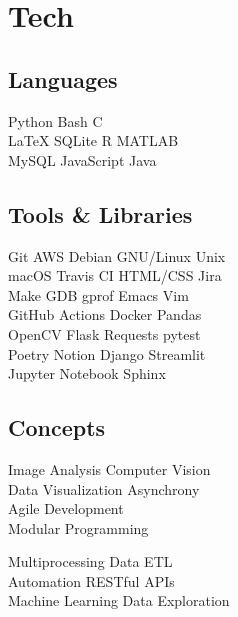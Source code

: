 \documentclass[]{jidicula-resume}
\begin{document}
\section{Tech}
\begin{minipage}[t]{.32\textwidth}
  \subsection{Languages}
  Python \textbullet{} Bash \textbullet{} C \\
  \LaTeX{} \textbullet{} SQLite \textbullet{} R \textbullet{} MATLAB  \\
  MySQL \textbullet{} JavaScript \textbullet{} Java
  \sectionsep{}
\end{minipage}
\hfill
\begin{minipage}[t]{.32\textwidth}
  \subsection{Tools \& Libraries}
  Git \textbullet{} AWS \textbullet{} {Debian GNU/Linux} \textbullet{} Unix \\
  macOS \textbullet{} Travis CI \textbullet{} HTML/CSS \textbullet{} Jira \\
  Make \textbullet{} GDB \textbullet{} gprof \textbullet{} Emacs \textbullet{} Vim \\
  GitHub Actions \textbullet{} Docker \textbullet{} Pandas \\
  OpenCV \textbullet{} Flask \textbullet{} Requests \textbullet{} pytest \\
  Poetry \textbullet{} Notion \textbullet{} Django \textbullet{} Streamlit \\
  Jupyter Notebook \textbullet{} Sphinx
  \sectionsep{}
\end{minipage}
\hfill
\begin{minipage}[t]{.32\textwidth}
  \subsection{Concepts}
  Image Analysis \textbullet{} Computer Vision \\
  Data Visualization \textbullet{} Asynchrony \\
  Agile Development \\
  Modular Programming
  
  Multiprocessing \textbullet{} Data ETL \\
  Automation \textbullet{}  RESTful APIs \\
  Machine Learning \textbullet{} Data Exploration
  \sectionsep{}
\end{minipage}
\end{document}

